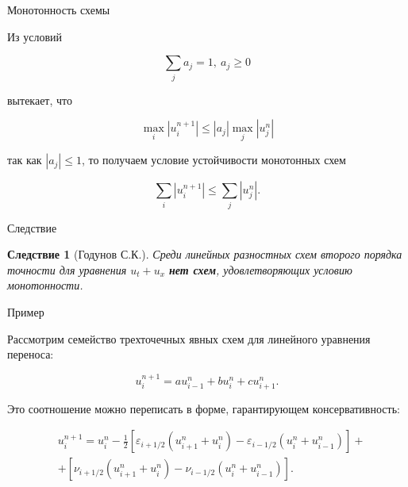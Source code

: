 \documentclass[10pt,xcolor=pst,aspectratio=169]{beamer}
\begin{document}
\begin{frame}{Монотонность схемы}

	\transdissolve[duration=0.1]
	\justifying
	\large

	Из условий

	\[
		\sum_{j} a_{j} = 1, \: a_{j} \geq 0
	\]

	вытекает, что

	\[
		\max_{i} \left| u_{i}^{n + 1} \right| \leq \left| a_{j} \right| \max_{j} \left| u_{j}^{n} \right|
	\]

	так как $\left| a_{j} \right| \leq 1$, то получаем условие устойчивости монотонных схем

	\[
		\sum_{i} \left| u_{i}^{n + 1} \right| \leq \sum_{j} \left| u_{j}^{n} \right|.
	\]

\end{frame}

\begin{frame}{Следствие}

	\transdissolve[duration=0.1]
	\justifying
	\large

	\newtheorem{Th2}{Следствие}
	\begin{Th2}[Годунов С.К.]
		\justifying
		Среди линейных разностных схем второго порядка точности для уравнения $u_{t} + u_{x}$ \textbf{нет схем}, удовлетворяющих условию монотонности.
	\end{Th2}

\end{frame}

\begin{frame}{Пример}

	\transdissolve[duration=0.1]
	\justifying
	\large

	Рассмотрим семейство трехточечных явных схем для линейного уравнения переноса:

	\[
		u_{i}^{n + 1} = a u_{i - 1}^{n} + b u_{i}^{n} + c u_{i + 1}^{n}.
	\]

	Это соотношение можно переписать в форме, гарантирующем консервативность:

	\[
		\begin{split}
			&u_{i}^{n + 1} = u_{i}^{n} - \frac{1}{2} \left[ \varepsilon_{i + 1/2} (u_{i + 1}^{n} + u_{i}^{n}) - \varepsilon_{i - 1/2} (u_{i}^{n} + u_{i - 1}^{n})\right] + \\
			& + \left[ \nu_{i + 1/2} (u_{i + 1}^{n} + u_{i}^{n}) - \nu_{i - 1/2} (u_{i}^{n} + u_{i - 1}^{n})\right].
		\end{split}
	\]

\end{frame}
\end{document}
